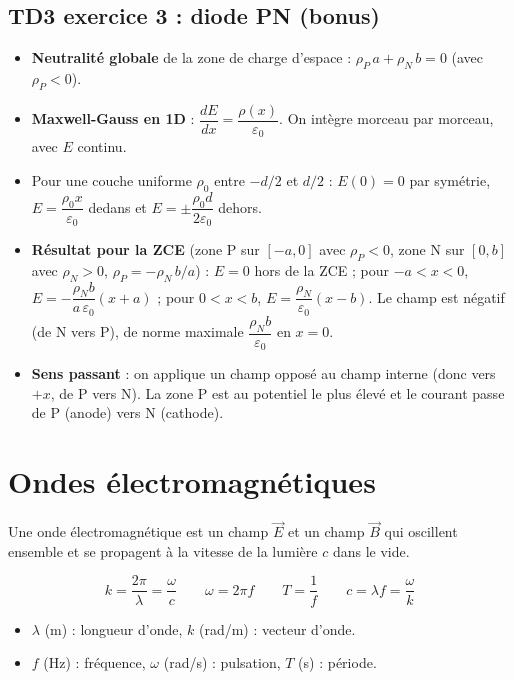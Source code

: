 \documentclass[11pt,a4paper]{article}
\newcommand{\vect}[1]{\overrightarrow{#1}}
\newcommand{\E}{\vect{E}}
\newcommand{\eps}{\varepsilon_0}
\begin{document}
\subsection{TD3 exercice 3 : diode PN (bonus)}

\begin{methode}
\begin{itemize}[leftmargin=1.5em]
  \item \textbf{Neutralité globale} de la zone de charge d'espace : $\rho_P\,a+\rho_N\,b=0$ (avec $\rho_P<0$).
  \item \textbf{Maxwell-Gauss en 1D} : $\dfrac{dE}{dx}=\dfrac{\rho(x)}{\eps}$. On intègre morceau par morceau, avec $E$ continu.
  \item Pour une couche uniforme $\rho_0$ entre $-d/2$ et $d/2$ : $E(0)=0$ par symétrie, $E=\dfrac{\rho_0x}{\eps}$ dedans et $E=\pm\dfrac{\rho_0 d}{2\eps}$ dehors.
  \item \textbf{Résultat pour la ZCE} (zone P sur $[-a,0]$ avec $\rho_P<0$, zone N sur $[0,b]$ avec $\rho_N>0$, $\rho_P=-\rho_N\,b/a$) : $E=0$ hors de la ZCE ; pour $-a<x<0$, $E=-\dfrac{\rho_N b}{a\,\eps}(x+a)$ ; pour $0<x<b$, $E=\dfrac{\rho_N}{\eps}(x-b)$. Le champ est négatif (de N vers P), de norme maximale $\dfrac{\rho_N b}{\eps}$ en $x=0$.
  \item \textbf{Sens passant} : on applique un champ opposé au champ interne (donc vers $+x$, de P vers N). La zone P est au potentiel le plus élevé et le courant passe de P (anode) vers N (cathode).
\end{itemize}
\end{methode}

\section{Ondes électromagnétiques}

\begin{idee}[Définition]
Une onde électromagnétique est un champ $\E$ et un champ $\vect{B}$ qui oscillent ensemble et se propagent à la vitesse de la lumière $c$ dans le vide.
\end{idee}

\begin{formule}
\[
k=\frac{2\pi}{\lambda}=\frac{\omega}{c}
\qquad
\omega=2\pi f
\qquad
T=\frac1f
\qquad
\boxed{c=\lambda f=\frac{\omega}{k}}
\]
\begin{itemize}
  \item $\lambda$ (m) : longueur d'onde, $k$ (rad/m) : vecteur d'onde.
  \item $f$ (Hz) : fréquence, $\omega$ (rad/s) : pulsation, $T$ (s) : période.
\end{itemize}
\end{formule}
\end{document}
